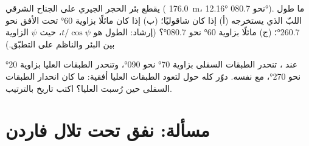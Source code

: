 \begin{exercise}[$\star\star\star$]\label{exo:b1:cross-sections:11}
يقطع بئر الحجر الجيري على الجناح الشرقي ( \qty{176.0}{m}،  \ang{12.16} نحو \ang{080.7}). ما طول اللبّ الذي يستخرجه (أ) إذا كان شاقوليًا؛ (ب) إذا كان مائلًا بزاوية \ang{60} تحت الأفق نحو \ang{260.7}؛ (ج) مائلًا بزاوية \ang{60} نحو \ang{080.7}؟ (إرشاد: الطول هو $t/\cos\psi$، حيث $\psi$ الزاوية بين البئر والناظم على التطبّق.)
\end{exercise}

\begin{exercise}[$\star\star\star$]\label{exo:b1:cross-sections:12}
عند ، تنحدر الطبقات السفلى بزاوية \ang{70} نحو \ang{090}، وتنحدر الطبقات العليا بزاوية \ang{20} نحو \ang{270}، مع  نفسه. دوّر  كله حول  لتعود الطبقات العليا أفقية: ما كان انحدار الطبقات السفلى حين رُسبت العليا؟ اكتب تاريخ  بالترتيب.
\end{exercise}

\section{مسألة: نفق تحت تلال فاردن}

